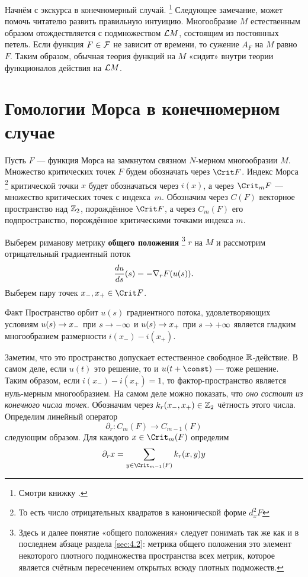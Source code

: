 Начнём с экскурса в конечномерный случай.%
\footnote{Смотри книжку \cite{Sch1}.}
Следующее замечание, может помочь читателю развить
правильную интуицию.  Многообразие $M$ естественным образом
отождествляется с подмножеством $\mathcal{L} M$, состоящим из постоянных
петель.
Если функция $F\in\mathcal{F}$ не зависит от времени, то сужение $A_{F}$ на $M$ равно $F$.
Таким образом, обычная теория функций на $M$ «сидит» внутри теории функционалов действия на $\mathcal{L} M$. 



\section[Конечномерный случай]{Гомологии Морса в конечномерном\\ случае}\label{13.2}

Пусть $F$ — функция Морса на замкнутом связном $N$-мерном
многообразии $M$. 
Множество критических точек $F$ будем обозначать через $\Crit F$.
Индекс Морса%
\footnote{То есть число отрицательных квадратов в канонической форме $d^{2}_{x}F$} критической точки $x$ будет обозначаться через $i(x)$, а через $\Crit_{m} F$ — множество критических точек с индекса~$m$.
Обозначим через $C(F)$ векторное пространство над $\mathbb{Z}_{2}$,
порождённое $\Crit F$, а через $C_{m}(F)$ его подпространство,
порождённое критическими точками индекса $m$.

Выберем риманову метрику \textbf{общего положения}%
\footnote{Здесь и далее понятие «общего положения» следует понимать
  так же как и в последнем абзаце раздела \ref{sec:4.2}: метрика
  общего положения это элемент некоторого плотного подмножества
  пространства всех метрик, которое является счётным пересечением
  открытых всюду плотных подможеств.} 
$r$ на $M$ и рассмотрим отрицательный градиентный поток
\[
\frac{d u}{d s} (s) = -\nabla_{r} F(u(s)).
\]
Выберем пару точек $x_{-},x_{+} \in \Crit F$.

\begin{thm}{Факт}\label{13.2.A}
Пространство орбит $u(s)$ градиентного потока, удовлетворяющих условиям $u(s)\z\to x_{-}$ при $s\z\to-\infty$ и $u(s)\z\to x_{+}$ при $s\z\to+\infty$ является гладким многообразием размерности $i(x_{-})-i(x_{+})$.
\end{thm}
  
Заметим, что это пространство допускает естественное свободное
$\mathbb{R}$-действие. 
В самом деле, если $u(t)$ это решение, то и $u(t+\const)$ — тоже решение.
Таким образом, если $i(x_{-})-i(x_{+}) = 1$, то фактор-пространство
является нуль-мерным многообразием.
На самом деле можно показать, что \textit{оно состоит из конечного числа точек.}
Обозначим через $k_{r}(x_{-},x_{+})\in \mathbb{Z}_{2}$ чётность этого числа.
Определим линейный оператор
\[
\partial_{r}: C_{m}(F)\to C_{m-1}(F)
\]
следующим образом. Для каждого $x \in \Crit_{m}(F)$ определим
\[
\partial_{r}x = \sum_{y\in\Crit_{m-1}(F)}k_{r}(x,y)y
\]

